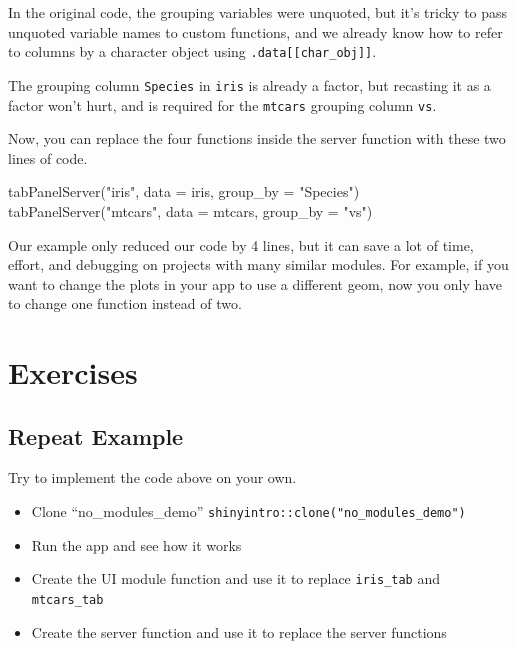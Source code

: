\documentclass[
  oneside]{book}
\newenvironment{Shaded}{\begin{snugshade}}{\end{snugshade}}
\newcommand{\AttributeTok}[1]{\textcolor[rgb]{0.77,0.63,0.00}{#1}}
\newcommand{\FunctionTok}[1]{\textcolor[rgb]{0.00,0.00,0.00}{#1}}
\newcommand{\NormalTok}[1]{#1}
\newcommand{\StringTok}[1]{\textcolor[rgb]{0.31,0.60,0.02}{#1}}
\providecommand{\tightlist}{%
  \setlength{\itemsep}{0pt}\setlength{\parskip}{0pt}}
\begin{document}
\begin{warning}
In the original code, the grouping variables were unquoted, but it's tricky to pass unquoted variable names to custom functions, and we already know how to refer to columns by a character object using \texttt{.data{[}{[}char\_obj{]}{]}}.

The grouping column \texttt{Species} in \texttt{iris} is already a factor, but recasting it as a factor won't hurt, and is required for the \texttt{mtcars} grouping column \texttt{vs}.

\end{warning}

Now, you can replace the four functions inside the server function with these two lines of code.

\begin{Shaded}
\begin{Highlighting}[]
\FunctionTok{tabPanelServer}\NormalTok{(}\StringTok{"iris"}\NormalTok{, }\AttributeTok{data =}\NormalTok{ iris, }\AttributeTok{group\_by =} \StringTok{"Species"}\NormalTok{)}
\FunctionTok{tabPanelServer}\NormalTok{(}\StringTok{"mtcars"}\NormalTok{, }\AttributeTok{data =}\NormalTok{ mtcars, }\AttributeTok{group\_by =} \StringTok{"vs"}\NormalTok{)}
\end{Highlighting}
\end{Shaded}

Our example only reduced our code by 4 lines, but it can save a lot of time, effort, and debugging on projects with many similar modules. For example, if you want to change the plots in your app to use a different geom, now you only have to change one function instead of two.

\hypertarget{exercises-modules}{%
\section{Exercises}\label{exercises-modules}}

\hypertarget{repeat-example}{%
\subsection{Repeat Example}\label{repeat-example}}

Try to implement the code above on your own.

\begin{itemize}
\tightlist
\item
  Clone ``no\_modules\_demo'' \texttt{shinyintro::clone("no\_modules\_demo")}
\item
  Run the app and see how it works
\item
  Create the UI module function and use it to replace \texttt{iris\_tab} and \texttt{mtcars\_tab}
\item
  Create the server function and use it to replace the server functions
\end{itemize}
\end{document}
